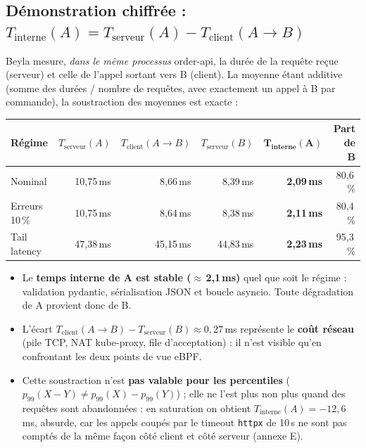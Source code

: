 \documentclass[10pt,a4paper]{article}
\newcommand{\code}[1]{\texttt{\small #1}}
\begin{document}
\subsection{Démonstration chiffrée : $T_{\text{interne}}(A) = T_{\text{serveur}}(A) - T_{\text{client}}(A\rightarrow B)$}

Beyla mesure, \emph{dans le même processus} order-api, la durée de la requête reçue (serveur) et celle de l'appel sortant vers B (client). La moyenne étant additive (somme des durées / nombre de requêtes, avec exactement un appel à B par commande), la soustraction des moyennes est exacte :

\begin{table}[H]\centering\small
\begin{tabular}{@{}lrrrrr@{}}
\toprule
\textbf{Régime} & $T_{\text{serveur}}(A)$ & $T_{\text{client}}(A\!\rightarrow\!B)$ & $T_{\text{serveur}}(B)$ & $\boldsymbol{T_{\text{interne}}(A)}$ & \textbf{Part de B} \\ \midrule
Nominal       & 10,75\,ms & 8,66\,ms & 8,39\,ms & \textbf{2,09\,ms} & 80,6\,\% \\
Erreurs 10\,\%& 10,75\,ms & 8,64\,ms & 8,38\,ms & \textbf{2,11\,ms} & 80,4\,\% \\
Tail latency  & 47,38\,ms & 45,15\,ms & 44,83\,ms & \textbf{2,23\,ms} & 95,3\,\% \\
\bottomrule
\end{tabular}
\end{table}

\begin{itemize}
  \item Le \textbf{temps interne de A est stable ($\approx$\,2,1\,ms)} quel que soit le régime : validation pydantic, sérialisation JSON et boucle asyncio. Toute dégradation de A provient donc de B.
  \item L'écart $T_{\text{client}}(A\!\rightarrow\!B) - T_{\text{serveur}}(B) \approx 0{,}27$\,ms représente le \textbf{coût réseau} (pile TCP, NAT kube-proxy, file d'acceptation) : il n'est visible qu'en confrontant les deux points de vue eBPF.
  \item Cette soustraction n'est \textbf{pas valable pour les percentiles} ($p_{99}(X-Y)\neq p_{99}(X)-p_{99}(Y)$) ; elle ne l'est plus non plus quand des requêtes sont abandonnées : en saturation on obtient $T_{\text{interne}}(A)=-12{,}6$\,ms, absurde, car les appels coupés par le timeout \code{httpx} de 10\,s ne sont pas comptés de la même façon côté client et côté serveur (annexe E).
\end{itemize}
\end{document}
